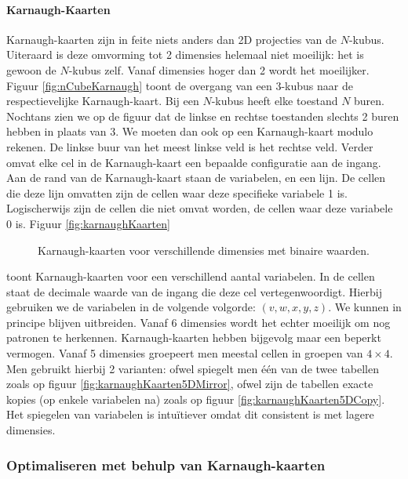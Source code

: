\paragraph{Karnaugh-Kaarten}Karnaugh-kaarten zijn in feite niets anders dan 2D projecties van de $N$-kubus. Uiteraard is deze omvorming tot 2 dimensies helemaal niet moeilijk: het is gewoon de $N$-kubus zelf. Vanaf dimensies hoger dan 2 wordt het moeilijker. Figuur \ref{fig:nCubeKarnaugh}
toont de overgang van een 3-kubus naar de respectievelijke Karnaugh-kaart. Bij een $N$-kubus heeft elke toestand $N$ buren. Nochtans zien we op de figuur dat de linkse en rechtse toestanden slechts 2 buren hebben in plaats van 3. We moeten dan ook op een Karnaugh-kaart modulo rekenen. De linkse buur van het meest linkse veld is het rechtse veld. Verder omvat elke cel in de Karnaugh-kaart een bepaalde configuratie aan de ingang. Aan de rand van de Karnaugh-kaart staan de variabelen, en een lijn. De cellen die deze lijn omvatten zijn de cellen waar deze specifieke variabele 1 is. Logischerwijs zijn de cellen die niet omvat worden, de cellen waar deze variabele 0 is. Figuur \ref{fig:karnaughKaarten}
\begin{figure}[hbt]
\centering
{}
\caption{Karnaugh-kaarten voor verschillende dimensies met binaire waarden.}
\end{figure}
toont Karnaugh-kaarten voor een verschillend aantal variabelen. In de cellen staat de decimale waarde van de ingang die deze cel vertegenwoordigt. Hierbij gebruiken we de variabelen in de volgende volgorde: $\left(v,w,x,y,z\right)$. We kunnen in principe blijven uitbreiden. Vanaf 6 dimensies wordt het echter moeilijk om nog patronen te herkennen. Karnaugh-kaarten hebben bijgevolg maar een beperkt vermogen. Vanaf 5 dimensies groepeert men meestal cellen in groepen van $4\times 4$. Men gebruikt hierbij 2 varianten: ofwel spiegelt men \'e\'en van de twee tabellen zoals op figuur \ref{fig:karnaughKaarten5DMirror}, ofwel zijn de tabellen exacte kopies (op enkele variabelen na) zoals op figuur \ref{fig:karnaughKaarten5DCopy}. Het spiegelen van variabelen is intu\"itiever omdat dit consistent is met lagere dimensies.
\subsubsection{Optimaliseren met behulp van Karnaugh-kaarten}
